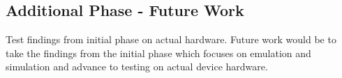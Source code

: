 \subsection{Additional Phase - Future Work}
Test findings from initial phase on actual hardware. 
Future work would be to take the findings from the initial phase which focuses on emulation and simulation and advance to testing on actual device hardware.
